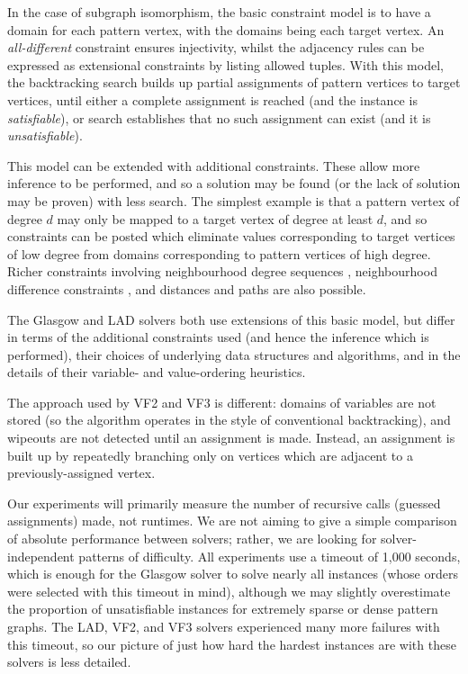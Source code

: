 \documentclass[twoside,11pt]{article}
\newcommand{\citep}[1]{\cite{#1}}
\begin{document}
In the case of subgraph isomorphism, the basic constraint model is to have a domain for each pattern
vertex, with the domains being each target vertex. An \emph{all-different} constraint ensures
injectivity, whilst the adjacency rules can be expressed as extensional constraints by listing
allowed tuples.  With this model, the backtracking search builds up partial assignments of pattern
vertices to target vertices, until either a complete assignment is reached (and the instance is
\emph{satisfiable}), or search establishes that no such assignment can exist (and it is
\emph{unsatisfiable}).

This model can be extended with additional constraints. These allow more inference to be performed,
and so a solution may be found (or the lack of solution may be proven) with less search.  The
simplest example is that a pattern vertex of degree $d$ may only be mapped to a target vertex of
degree at least $d$, and so constraints can be posted which eliminate values corresponding to target
vertices of low degree from domains corresponding to pattern vertices of high degree. Richer
constraints involving neighbourhood degree sequences \citep{DBLP:journals/constraints/ZampelliDS10},
neighbourhood difference constraints \citep{DBLP:journals/ai/Solnon10}, and distances and paths
\citep{DBLP:conf/cp/AudemardLMGP14,DBLP:conf/cp/McCreeshP15,DBLP:conf/lion/KotthoffMS16} are also
possible.

The Glasgow and LAD solvers both use extensions of this basic model, but differ in terms of the
additional constraints used (and hence the inference which is performed), their choices of
underlying data structures and algorithms, and in the details of their variable- and value-ordering
heuristics.

The approach used by VF2 and VF3 is different: domains of variables are not stored (so the algorithm
operates in the style of conventional backtracking), and wipeouts are not detected until an
assignment is made. Instead, an assignment is built up by repeatedly branching only on vertices
which are adjacent to a previously-assigned vertex.

Our experiments will primarily measure the number of recursive calls (guessed assignments) made, not
runtimes. We are not aiming to give a simple comparison of absolute performance between solvers;
rather, we are looking for solver-independent patterns of difficulty. All experiments use a timeout
of 1,000 seconds, which is enough for the Glasgow solver to solve nearly all instances (whose orders
were selected with this timeout in mind), although we may slightly overestimate the proportion of
unsatisfiable instances for extremely sparse or dense pattern graphs. The LAD, VF2, and VF3 solvers
experienced many more failures with this timeout, so our picture of just how hard the hardest
instances are with these solvers is less detailed.
\end{document}

